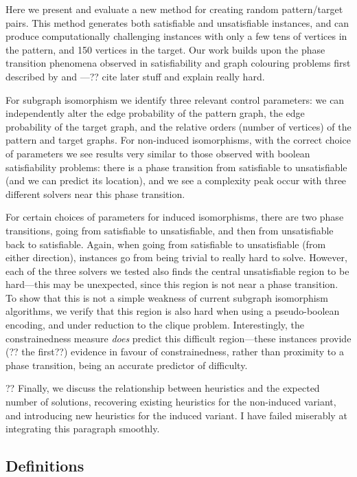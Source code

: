 \documentclass[letterpaper]{article}
\begin{document}
Here we present and evaluate a new method for creating random pattern/target pairs. This method
generates both satisfiable and unsatisfiable instances, and can produce computationally challenging
instances with only a few tens of vertices in the pattern, and 150 vertices in the target. Our work
builds upon the phase transition phenomena observed in satisfiability and graph colouring problems
first described by \citet{Cheeseman:1991} and \citet{Mitchell:1992}---?? cite later stuff and
explain really hard.

For subgraph isomorphism we identify three relevant control parameters: we can independently alter
the edge probability of the pattern graph, the edge probability of the target graph, and the
relative orders (number of vertices) of the pattern and target graphs.  For non-induced
isomorphisms, with the correct choice of parameters we see results very similar to those observed
with boolean satisfiability problems: there is a phase transition from satisfiable to unsatisfiable
(and we can predict its location), and we see a complexity peak occur with three different solvers
near this phase transition.

For certain choices of parameters for induced isomorphisms, there are two phase transitions, going
from satisfiable to unsatisfiable, and then from unsatisfiable back to satisfiable. Again, when
going from satisfiable to unsatisfiable (from either direction), instances go from being trivial to
really hard to solve. However, each of the three solvers we tested also finds the central
unsatisfiable region to be hard---this may be unexpected, since this region is not near a
phase transition. To show that this is not a simple weakness of current subgraph isomorphism
algorithms, we verify that this region is also hard when using a pseudo-boolean encoding, and
under reduction to the clique problem. Interestingly, the constrainedness measure
\citep{Gent:1996:Kappa} \emph{does} predict this difficult region---these instances provide (?? the
first??) evidence in favour of constrainedness, rather than proximity to a phase transition, being
an accurate predictor of difficulty.

?? Finally, we discuss the relationship between heuristics and the expected number of solutions,
recovering existing heuristics for the non-induced variant, and introducing new heuristics for the
induced variant. I have failed miserably at integrating this paragraph smoothly.

\subsection{Definitions}
\end{document}
